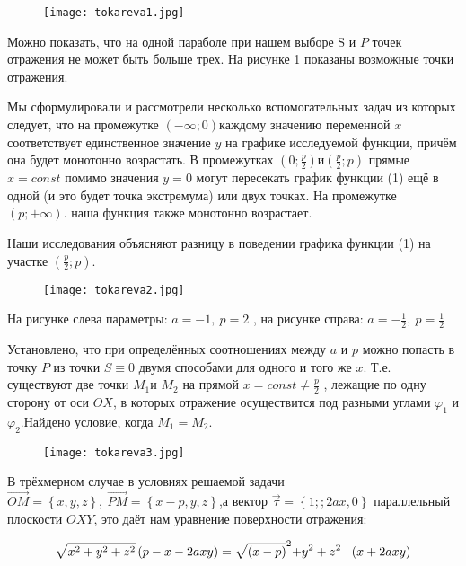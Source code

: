 \begin{figure}
	\centering
	\texttt{[image: tokareva1.jpg]}
\end{figure}

Можно показать, что на одной параболе при нашем выборе S и $P$ точек отражения не может быть больше трех. На рисунке 1 показаны возможные точки отражения.

Мы сформулировали и рассмотрели несколько вспомогательных задач из которых следует, что на промежутке $\left(-\infty ;0\right)$каждому значению переменной $x$ соответствует единственное значение $y$ на графике исследуемой функции, причём она будет монотонно возрастать. В промежутках $\left(0;\frac{p}{2}\right)и\left(\frac{p}{2};p\right)$ прямые $x=const$ помимо значения $y=0$ могут пересекать график функции (1) ещё в одной (и это будет точка экстремума) или двух точках. На промежутке $\left(p;+\infty \right).$ наша функция также монотонно возрастает.

Наши исследования объясняют разницу в поведении графика функции (1) на участке $\left(\frac{p}{2};p\right)$.

\begin{figure}
	\centering
	\texttt{[image: tokareva2.jpg]}
\end{figure}

На рисунке слева параметры: $a=-1,\ p=2$ , на рисунке справа: $a=-\frac{1}{2},\ p=\frac{1}{2}$

Установлено, что при определённых соотношениях между $a$ и $p$ можно попасть в точку $P$ из точки $S\equiv 0$ двумя способами для одного и того же $x$. Т.е. существуют две точки $M_1 $и $M_2$ на прямой $x=const\ne \frac{p}{2}$ , лежащие по одну сторону от оси $OX$, в которых отражение осуществится под разными углами $\varphi_1$ и $\varphi_2$.Найдено условие, когда $M_1=M_2$.

\begin{figure}
	\centering
	\texttt{[image: tokareva3.jpg]}
\end{figure}

В трёхмерном случае в условиях решаемой задачи $\overrightarrow{OM}=\left\{x,y,z\right\},\ \overrightarrow{PM}=\left\{x-p,y,z\right\}$,а вектор $\overrightarrow{\tau }=\left\{1;;2ax,0\right\}$ параллельный плоскости $OXY$, это даёт нам уравнение поверхности отражения:

\begin{equation} \label{GrindEQ__2_} \sqrt{x^2+y^2+z^2}\left(p-x-2axy\right)=\sqrt{(x-p)}^{{\rm 2}}{\rm +}y^{{\rm 2}}+z^{{\rm 2}}\ \ \left(x+2axy\right) \end{equation}

